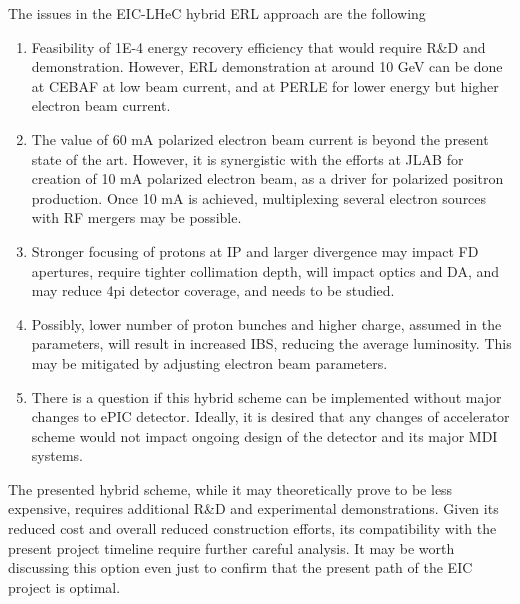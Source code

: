 \documentclass{article}
\begin{document}
The issues in the EIC-LHeC hybrid ERL approach are the following
\begin{enumerate}
\item
Feasibility of 1E-4 energy recovery efficiency that would require R\&D and demonstration. However, ERL demonstration at around 10 GeV can be done at CEBAF at low beam current, and at PERLE for lower energy but higher electron beam current.  
\item
The value of 60 mA polarized electron beam current is beyond the present state of the art. However, it is synergistic with the efforts at JLAB for creation of 10 mA polarized electron beam, as a driver for polarized positron production. Once 10 mA is achieved, multiplexing several electron sources with RF mergers may be possible. 
\item
Stronger focusing of protons at IP and larger divergence may impact FD apertures, require tighter collimation depth, will impact optics and DA, and may reduce 4pi detector coverage, and needs to be studied. 
\item
Possibly, lower number of proton bunches and higher charge, assumed in the parameters, will result in increased IBS, reducing the average luminosity. This may be mitigated by adjusting electron beam parameters. 
\item
There is a question if this hybrid scheme can be implemented without major changes to ePIC detector. Ideally, it is desired that any changes of accelerator scheme would not impact ongoing design of the detector and its major MDI systems. 
\end{enumerate}
The presented hybrid scheme, while it may theoretically prove to be less expensive, requires additional R\&D and experimental demonstrations. Given its reduced cost and overall reduced construction efforts, its compatibility with the present project timeline require further careful analysis. It may be worth discussing this option even just to confirm that the present path of the EIC project is optimal. 
\end{document}
